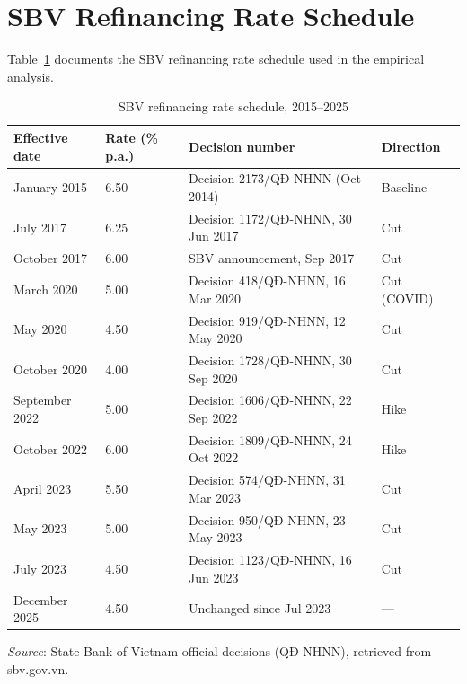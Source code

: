 \documentclass[12pt,a4paper]{article}
\begin{document}
\section{SBV Refinancing Rate Schedule}
\label{app:ir}

Table~\ref{tab:ir} documents the SBV refinancing rate schedule used
in the empirical analysis.

\begin{table}[H]
\caption{SBV refinancing rate schedule, 2015--2025}
\label{tab:ir}
\centering
\small
\begin{tabular}{llll}
\toprule
Effective date & Rate (\% p.a.) & Decision number & Direction \\
\midrule
January 2015 & 6.50 & Decision 2173/QĐ-NHNN (Oct 2014) & Baseline \\
July 2017 & 6.25 & Decision 1172/QĐ-NHNN, 30 Jun 2017 & Cut \\
October 2017 & 6.00 & SBV announcement, Sep 2017 & Cut \\
March 2020 & 5.00 & Decision 418/QĐ-NHNN, 16 Mar 2020 & Cut (COVID) \\
May 2020 & 4.50 & Decision 919/QĐ-NHNN, 12 May 2020 & Cut \\
October 2020 & 4.00 & Decision 1728/QĐ-NHNN, 30 Sep 2020 & Cut \\
September 2022 & 5.00 & Decision 1606/QĐ-NHNN, 22 Sep 2022 & Hike \\
October 2022 & 6.00 & Decision 1809/QĐ-NHNN, 24 Oct 2022 & Hike \\
April 2023 & 5.50 & Decision 574/QĐ-NHNN, 31 Mar 2023 & Cut \\
May 2023 & 5.00 & Decision 950/QĐ-NHNN, 23 May 2023 & Cut \\
July 2023 & 4.50 & Decision 1123/QĐ-NHNN, 16 Jun 2023 & Cut \\
December 2025 & 4.50 & Unchanged since Jul 2023 & --- \\
\bottomrule
\end{tabular}
\begin{minipage}{\linewidth}
\vspace{4pt}
\footnotesize
\textit{Source}: State Bank of Vietnam official decisions (QĐ-NHNN),
retrieved from sbv.gov.vn.
\end{minipage}
\end{table}
\end{document}
